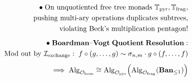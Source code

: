 \documentclass[preview]{standalone}
\begin{document}
\begin{align*}
\special{dvisvgm:raw <g id='unique000'>}\bullet\;\text{On unquotiented free tree monads }\mathbb{T}_{\text{pyr}}, \mathbb{T}_{\text{frag}},\\\;\;\text{pushing multi-ary operations duplicates subtrees,}\\\;\;\text{violating Beck's multiplication pentagon!}\\[5pt]\bullet\;\mathbf{Boardman\text{--}Vogt\;Quotient\;Resolution:}\\\;\;\text{Mod out by }\mathcal{I}_{\text{exchange}}:\; f\circ(g,\dots,g) \sim \sigma_{n,m}\cdot g\circ(f,\dots,f)\\[4pt]\implies \operatorname{Alg}_{\mathcal{O}_{\text{hom}}} \cong \operatorname{Alg}_{\mathcal{O}_{\text{pyr}}}\!\left(\operatorname{Alg}_{\mathcal{O}_{\text{frag}}}(\mathbf{Ban}_{\le 1})\right)\special{dvisvgm:raw </g>}
\end{align*}
\end{document}
